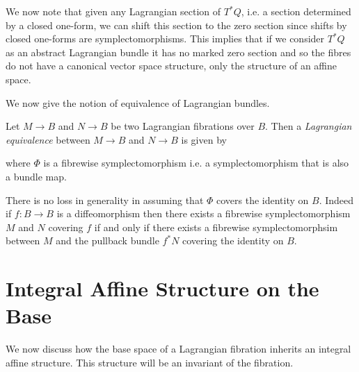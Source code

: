 \begin{remark}
    We now note that given any Lagrangian section of $T^*Q$, i.e. a section determined by a closed one-form, we can shift this section to the zero section
    since shifts by closed one-forms are symplectomorphisms. This implies that if we consider $T^*Q$ as an abstract Lagrangian bundle it has no marked zero section and
    so the fibres do not have a canonical vector space structure, only the structure of an affine space.
\end{remark}

We now give the notion of equivalence of Lagrangian bundles.

\begin{definition}
    Let $M \to B$ and $N \to B$ be two Lagrangian fibrations over $B$. Then a \emph{Lagrangian equivalence} between
    $M \to B$ and $N \to B$ is given by
    \begin{center}
    \end{center}
    where $\Phi$ is a fibrewise symplectomorphism i.e. a symplectomorphism that is also a bundle map.
\end{definition}
\begin{remark}
    There is no loss in generality in assuming that $\Phi$ covers the identity on $B$.  Indeed if $f: B \to B$
    is a diffeomorphism then there exists a fibrewise symplectomorphism $M$ and $N$ covering $f$ if and only if
    there exists a fibrewise symplectomorphsim between $M$ and the pullback bundle $f^*N$ covering the identity on $B$.
\end{remark}
\section{Integral Affine Structure on the Base}
We now discuss how the base space of a Lagrangian fibration inherits an
integral affine structure. This structure will be an invariant of the
fibration.

